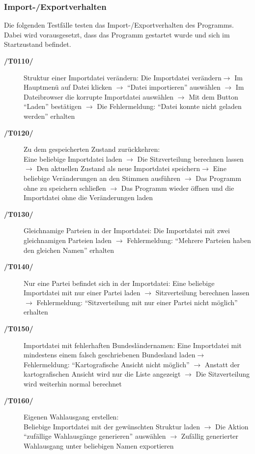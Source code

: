 \documentclass[10pt,a4paper]{article}
\begin{document}
\subsubsection{Import-/Exportverhalten}
Die folgenden Testfälle testen das Import-/Exportverhalten des Programms. Dabei wird vorausgesetzt, dass das Programm gestartet wurde und sich im Startzustand befindet. 
\begin{description}
	\item[\textbf{/T0110/}] Struktur einer Importdatei verändern: \newline
	Die Importdatei verändern$\rightarrow$ Im Hauptmenü auf Datei klicken $\rightarrow$ ``Datei importieren'' auswählen $\rightarrow$ Im Dateibrowser die korrupte Importdatei auswählen $\rightarrow$ Mit dem Button ``Laden'' bestätigen $\rightarrow$ Die Fehlermeldung: ``Datei konnte nicht geladen werden'' erhalten
	\item[\textbf{/T0120/}] Zu dem gespeicherten Zustand zurückkehren: \\
	Eine beliebige Importdatei laden $\rightarrow$ Die Sitzverteilung berechnen lassen$\rightarrow$ Den aktuellen Zustand als neue Importdatei speichern$\rightarrow$ Eine beliebige Veränderungen an den Stimmen ausführen $\rightarrow$ Das Programm ohne zu speichern schließen $\rightarrow$ Das Programm wieder öffnen und die Importdatei ohne die Veränderungen laden
	\item[\textbf{/T0130/}] Gleichnamige Parteien in der Importdatei: \newline
	Die Importdatei mit zwei gleichnamigen Parteien laden $\rightarrow$ Fehlermeldung: ``Mehrere Parteien haben den gleichen Namen'' erhalten
	\item[\textbf{/T0140/}] Nur eine Partei befindet sich in der Importdatei: \newline
	Eine beliebige Importdatei mit nur einer Partei laden $\rightarrow$ Sitzverteilung berechnen lassen $\rightarrow$ Fehlermeldung: ``Sitzverteilung mit nur einer Partei nicht möglich'' erhalten
	\item[\textbf{/T0150/}] Importdatei mit fehlerhaften Bundesländernamen: \newline
	Eine Importdatei mit mindestens einem falsch geschriebenen Bundesland laden$\rightarrow$ Fehlermeldung: ``Kartografische Ansicht nicht möglich'' $\rightarrow$ Anstatt der kartografischen Ansicht wird nur die Liste angezeigt $\rightarrow$ Die Sitzverteilung wird weiterhin normal berechnet\newline
	\item[\textbf{/T0160/}] Eigenen Wahlausgang erstellen: \\
	Beliebige Importdatei mit der gewünschten Struktur laden $\rightarrow$ Die Aktion ``zufällige Wahlausgänge generieren'' auswählen $\rightarrow$ Zufällig generierter Wahlausgang unter beliebigen Namen exportieren
\end{description}
\end{document}
